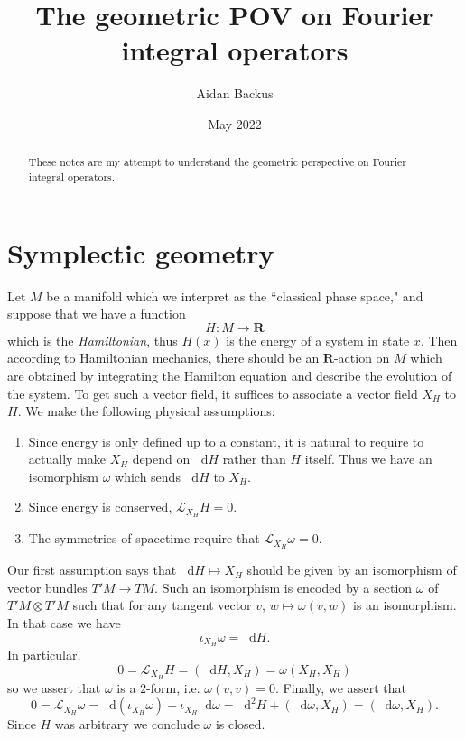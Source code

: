 \documentclass[reqno,12pt,letterpaper]{amsart}
\title[Geometric FIOs]{The geometric POV on Fourier integral operators}
\author{Aidan Backus}
\date{May 2022}
\newcommand{\RR}{\mathbf{R}}
\newcommand*\dif{\mathop{}\!\mathrm{d}}
\newcommand{\dfn}[1]{\emph{#1}\index{#1}}
\theoremstyle{definition}
\numberwithin{equation}{section}
\begin{document}
\begin{abstract}
    These notes are my attempt to understand the geometric perspective on Fourier integral operators.
\end{abstract}

\maketitle



\section{Symplectic geometry}
Let $M$ be a manifold which we interpret as the ``classical phase space," and suppose that we have a function 
$$H: M \to \RR$$
which is the \dfn{Hamiltonian}, thus $H(x)$ is the energy of a system in state $x$.
Then according to Hamiltonian mechanics, there should be an $\RR$-action on $M$ which are obtained by integrating the Hamilton equation and describe the evolution of the system.
To get such a vector field, it suffices to associate a vector field $X_H$ to $H$. We make the following physical assumptions:
\begin{enumerate}
\item Since energy is only defined up to a constant, it is natural to require to actually make $X_H$ depend on $\dif H$ rather than $H$ itself. Thus we have an isomorphism $\omega$ which sends $\dif H$ to $X_H$.
\item Since energy is conserved, $\mathcal L_{X_H} H = 0$.
\item The symmetries of spacetime require that $\mathcal L_{X_H} \omega = 0$.
\end{enumerate}
Our first assumption says that $\dif H \mapsto X_H$ should be given by an isomorphism of vector bundles $T'M \to TM$.
Such an isomorphism is encoded by a section $\omega$ of $T'M \otimes T'M$ such that for any tangent vector $v$, $w \mapsto \omega(v, w)$ is an isomorphism.
In that case we have
$$\iota_{X_H} \omega = \dif H.$$
In particular, 
$$0 = \mathcal L_{X_H} H =  (\dif H, X_H) = \omega(X_H, X_H)$$
so we assert that $\omega$ is a $2$-form, i.e. $\omega(v, v) = 0$.
Finally, we assert that 
$$0 = \mathcal L_{X_H} \omega = \dif (\iota_{X_H} \omega) + \iota_{X_H} \dif \omega = \dif^2 H + (\dif \omega, X_H) = (\dif \omega, X_H).$$
Since $H$ was arbitrary we conclude $\omega$ is closed.
\end{document}
